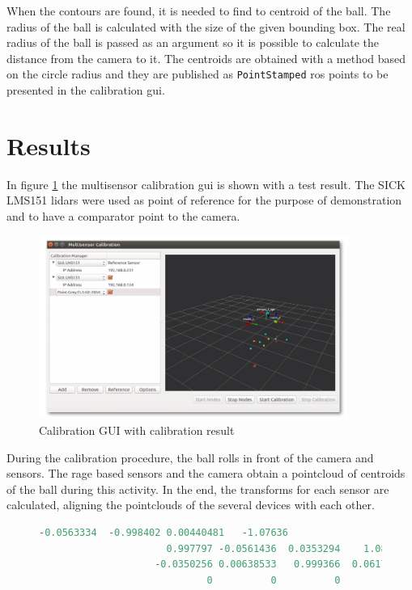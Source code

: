 When the contours are found, it is needed to find to centroid of the ball. The radius of the ball is calculated with the size of the given bounding box. The real radius of the ball is passed as an argument so it is possible to calculate the distance from the camera to it. The centroids are obtained with a method based on the circle radius and they are published as \texttt{PointStamped} \gls{ros} points to be presented in the calibration \gls{gui}. 

\section{Results}

In figure \ref{fig:gui} the multisensor calibration \gls{gui} is shown with a test result. The SICK LMS151 \gls{lidar}s were used as point of reference for the purpose of demonstration and to have a comparator point to the camera.
\begin{figure}[htp]
	
	\centering
	\includegraphics[width=0.9\textwidth]{capcalib/imgs/gui.png}
	
	\caption{Calibration GUI with calibration result}
	\label{fig:gui}
	
\end{figure}

During the calibration procedure, the ball rolls in front of the camera and sensors. The rage based sensors and the camera obtain a pointcloud of centroids of the ball during this activity. In the end, the transforms for each sensor are calculated, aligning the pointclouds of the several devices with each other. 

\begin{figure}
	\begin{center}
		\begin{lstlisting}[label={lst:calib_result}, caption={Calibration output file.},language=c++]
					-0.0563334  -0.998402 0.00440481   -1.07636
					  0.997797 -0.0561436  0.0353294    1.08224
					-0.0350256 0.00638533   0.999366  0.0617893
					         0          0          0          1	\end{lstlisting}
	\end{center}
\end{figure}

